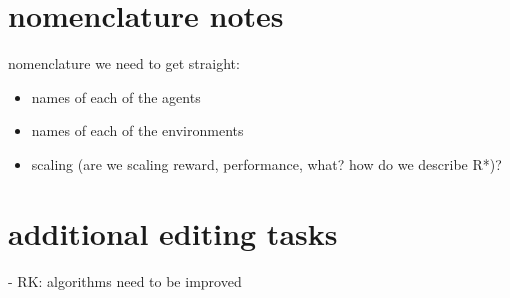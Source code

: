 \section*{nomenclature notes}
nomenclature we need to get straight:

\begin{itemize}
    \item names of each of the agents
    \item names of each of the environments
    \item scaling (are we scaling reward, performance, what? how do we describe R*)?
\end{itemize}

 
 
\section*{additional editing tasks}

 - RK: algorithms need to be improved